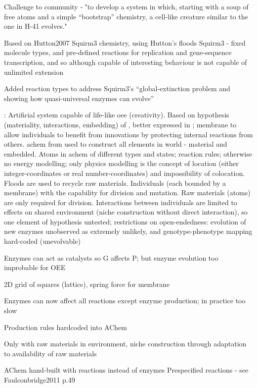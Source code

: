 \parencite{Lucht2012}

Challenge to community - "to develop a system in which, starting with a soup of free atoms and a simple ``bootstrap'' chemistry, a cell-like creature similar to the one in H-41 evolves."

Based on Hutton2007 Squirm3 chemistry, using Hutton's floods 
Squirm3 - fixed molecule types, and pre-defined reactions for replication and gene-sequence transcription, and so although capable of interesting behaviour is not capable of unlimited extension

Added reaction types to address Squirm3's ``global-extinction problem and showing how quasi-universal enzymes can evolve''

\cite{Hutton2007,Hutton2002}:
Artificial system capable of life-like \gls{oee} (creativity).
Based on hypothesis (materiality, interactions, embedding) of \textcite{Taylor2001}, better expressed in \textcite[p.341]{Hutton2002}; membrane to allow individuals to benefit from innovations by protecting internal reactions from others.
\Gls{achem} from \textcite{Hutton2002} used to construct all elements in world - material and embedded.
Atoms in \gls{achem} of different types and states; reaction rules; otherwise no energy modelling; only physics modelling is the concept of location (either integer-coordinates or real number-coordinates) and impossibility of colocation. Floods are used to recycle raw materials.
Individuals (each bounded by a membrane) with the capability for division and mutation. Raw materials (atoms) are only required for division.
Interactions between individuals are limited to effects on shared environment (niche construction without direct interaction), so one element of hypothesis untested; restrictions on open-endedness: evolution of new enzymes unobserved as extremely unlikely, and genotype-phenotype mapping hard-coded (unevolvable)

Enzymes can act as catalysts so G affects P; but enzyme evolution too improbable for OEE

2D grid of squares (lattice), spring force for membrane

Enzymes can now affect all reactions except enzyme production; in practice too slow

Production rules hardcoded into AChem

Only with raw materials in environment, niche construction through adaptation to availability of raw materials

AChem hand-built with reactions instead of enzymes
Prespecified reactions - see Faulconbridge2011 p.49

